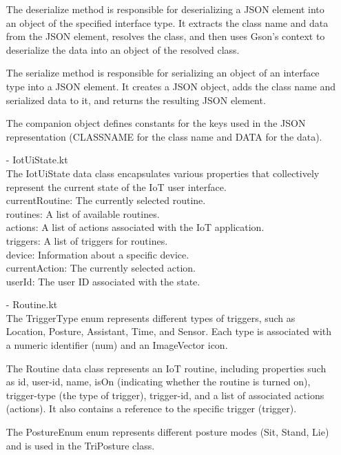 \begin{enumerate}
            The deserialize method is responsible for deserializing a JSON element into an object of the specified interface type. It extracts the class name and data from the JSON element, resolves the class, and then uses Gson's context to deserialize the data into an object of the resolved class.

            The serialize method is responsible for serializing an object of an interface type into a JSON element. It creates a JSON object, adds the class name and serialized data to it, and returns the resulting JSON element.

            The companion object defines constants for the keys used in the JSON representation (CLASSNAME for the class name and DATA for the data).\\
      \item[-] IotUiState.kt\\
            The IotUiState data class encapsulates various properties that collectively represent the current state of the IoT user interface.\\

            currentRoutine: The currently selected routine.\\
            routines: A list of available routines.\\
            actions: A list of actions associated with the IoT application.\\
            triggers: A list of triggers for routines.\\
            device: Information about a specific device.\\
            currentAction: The currently selected action.\\
            userId: The user ID associated with the state.\\
      \item[-] Routine.kt\\
            The TriggerType enum represents different types of triggers, such as Location, Posture, Assistant, Time, and Sensor. Each type is associated with a numeric identifier (num) and an ImageVector icon.

            The Routine data class represents an IoT routine, including properties such as id, user-id, name, isOn (indicating whether the routine is turned on), trigger-type (the type of trigger), trigger-id, and a list of associated actions (actions). It also contains a reference to the specific trigger (trigger).

            The PostureEnum enum represents different posture modes (Sit, Stand, Lie) and is used in the TriPosture class.


\end{enumerate}

